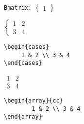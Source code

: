 \qquad
\verb|Bmatrix:| $\begin{Bmatrix} 1 \end{Bmatrix}$
%
\begin{minipage}{0.3\linewidth}
$\begin{cases}
	1 & 2 \\ 3 & 4
\end{cases}$
\end{minipage}
%
\begin{minipage}{0.5\linewidth}
\begin{lstlisting}
\begin{cases}
	 1 & 2 \\ 3 & 4 
\end{cases}
\end{lstlisting}
\end{minipage}
%
\negAbstand
\begin{minipage}{0.3\linewidth}
$\begin{array}{cc} 1 & 2 \\ 3 & 4 \end{array}$ 
\end{minipage}
\begin{minipage}{0.5\linewidth}
\begin{lstlisting}
\begin{array}{cc}
		1 & 2 \\ 3 & 4
\end{array}
\end{lstlisting}
\end{minipage}


